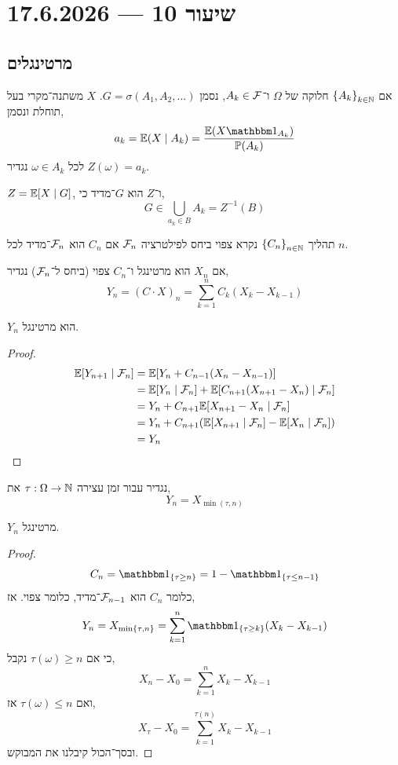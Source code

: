 \section{שיעור 10 --- 17.6.2026}
\subsection{מרטינגלים}
אם ${\{ A_k \}}_{k \in \mathbb{N}}$ חלוקה של $\Omega$ ו־$A_k \in \mathcal{F}$, נסמן $G = \sigma(A_1, A_2, \ldots)$.
$X$ משתנה־מקרי בעל תוחלת ונסמן,
\[
	a_k
	= \EE(X \mid A_k)
	= \frac{\EE(X \indicator_{A_k})}{\PP(A_k)}
\]
לכל $\omega \in A_k$ נגדיר $Z(\omega) = a_k$.
\begin{proposition}
	$Z = \mathbb{E}[X \mid G]$, ו־$Z$ הוא $G$־מדיד כי,
	\[
		G
		\in \bigcup_{a_k \in B} A_k
		= Z^{-1}(B)
	\]
\end{proposition}
\begin{definition}
	תהליך ${\{ C_n \}}_{n \in \mathbb{N}}$ נקרא צפוי ביחס לפילטרציה $\mathcal{F}_n$ אם $C_n$ הוא $\mathcal{F}_n$־מדיד לכל $n$.
\end{definition}
\begin{definition}
	אם $X_n$ הוא מרטינגל ו־$C_n$ צפוי (ביחס ל־$\mathcal{F}_n$) נגדיר,
	\[
		Y_n
		= {(C \cdot X)}_n
		= \sum_{k = 1}^n C_k (X_k - X_{k - 1})
	\]
\end{definition}
\begin{proposition}
	$Y_n$ הוא מרטינגל.
\end{proposition}
\begin{proof}
	\begin{align*}
		\mathbb{E}[Y_{n + 1} \mid \mathcal{F}_n]
		& = \mathbb{E}[Y_n + C_{n - 1}(X_n - X_{n - 1})] \\
		& = \mathbb{E}[Y_n \mid \mathcal{F}_n] + \mathbb{E}[C_{n + 1}(X_{n + 1} - X_n) \mid \mathcal{F}_n] \\
		& = Y_n + C_{n + 1} \mathbb{E}[X_{n + 1} - X_n \mid \mathcal{F}_n] \\
		& = Y_n + C_{n + 1}(\mathbb{E}[X_{n + 1} \mid \mathcal{F}_n] - \mathbb{E}[X_n \mid \mathcal{F}_n]) \\
		& = Y_n
	\end{align*}
\end{proof}
נגדיר עבור זמן עצירה $\tau : \Omega \to \mathbb{N}$ את,
\[
	Y_n
	= X_{\min(\tau, n)}
\]
\begin{proposition}
	$Y_n$ מרטינגל.
\end{proposition}
\begin{proof}
	\[
		C_n
		= \indicator_{\{\tau \ge n\}}
		= 1 - \indicator_{\{\tau \le n - 1 \}}
	\]
	כלומר $C_n$ הוא $\mathcal{F}_{n - 1}$־מדיד, כלומר צפוי.
	אז,
	\[
		Y_n
		= X_{\min\{\tau, n\}}
		= \sum_{k = 1}^n \indicator_{\{ \tau \ge k \}}(X_k - X_{k - 1})
	\]
	כי אם $\tau(\omega) \ge n$ נקבל,
	\[
		X_n - X_0
		= \sum_{k = 1}^n X_k - X_{k - 1}
	\]
	ואם $\tau(\omega) \le n$ אז,
	\[
		X_{\tau} - X_0
		= \sum_{k = 1}^{\tau(n)} X_k - X_{k - 1}
	\]
	ובסך־הכול קיבלנו את המבוקש.
\end{proof}
